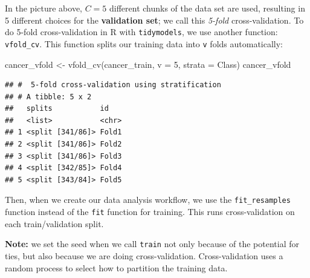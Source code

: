 \documentclass[
]{krantz}
\makeatletter
\newenvironment{Shaded}{\begin{snugshade}}{\end{snugshade}}
\newcommand{\AttributeTok}[1]{\textcolor[rgb]{0.61,0.61,0.61}{#1}}
\newcommand{\DecValTok}[1]{\textcolor[rgb]{0.06,0.06,0.06}{#1}}
\newcommand{\FunctionTok}[1]{\textcolor[rgb]{0,0,0}{#1}}
\newcommand{\NormalTok}[1]{#1}
\newcommand{\OtherTok}[1]{\textcolor[rgb]{0.37,0.37,0.37}{#1}}
\renewenvironment{quote}{\begin{VF}}{\end{VF}}
\newenvironment{kframe}{%
\medskip{}
\setlength{\fboxsep}{.8em}
 \def\at@end@of@kframe{}%
 \ifinner\ifhmode%
  \def\at@end@of@kframe{\end{minipage}}%
  \begin{minipage}{\columnwidth}%
 \fi\fi%
 \def\FrameCommand##1{\hskip\@totalleftmargin \hskip-\fboxsep
 \colorbox{shadecolor}{##1}\hskip-\fboxsep
     \hskip-\linewidth \hskip-\@totalleftmargin \hskip\columnwidth}%
 \MakeFramed {\advance\hsize-\width
   \@totalleftmargin\z@ \linewidth\hsize
   \@setminipage}}%
 {\par\unskip\endMakeFramed%
 \at@end@of@kframe}
\renewenvironment{Shaded}{\begin{kframe}}{\end{kframe}}
\makeatother
\begin{document}
In the picture above, \(C=5\) different chunks of the data set are used,
resulting in 5 different choices for the \textbf{validation set}; we call this
\emph{5-fold} cross-validation. To do 5-fold cross-validation in R with \texttt{tidymodels}, we
use another function: \texttt{vfold\_cv}. This function splits our training data into
\texttt{v} folds automatically:

\begin{Shaded}
\begin{Highlighting}[]
\NormalTok{cancer\_vfold }\OtherTok{\textless{}{-}} \FunctionTok{vfold\_cv}\NormalTok{(cancer\_train, }\AttributeTok{v =} \DecValTok{5}\NormalTok{, }\AttributeTok{strata =}\NormalTok{ Class)}
\NormalTok{cancer\_vfold}
\end{Highlighting}
\end{Shaded}

\begin{verbatim}
## #  5-fold cross-validation using stratification 
## # A tibble: 5 x 2
##   splits           id   
##   <list>           <chr>
## 1 <split [341/86]> Fold1
## 2 <split [341/86]> Fold2
## 3 <split [341/86]> Fold3
## 4 <split [342/85]> Fold4
## 5 <split [343/84]> Fold5
\end{verbatim}

Then, when we create our data analysis workflow, we use the \texttt{fit\_resamples} function
instead of the \texttt{fit} function for training. This runs cross-validation on each
train/validation split.

\begin{quote}
\textbf{Note:} we set the seed when we call \texttt{train} not only because of the potential for ties, but also because we are doing
cross-validation. Cross-validation uses a random process to select how to partition the training data.
\end{quote}
\end{document}
